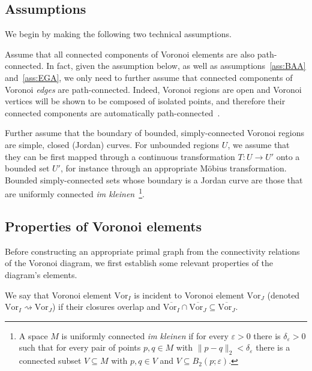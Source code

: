 \documentclass[11pt]{article}
\newcommand{\Vor}{\text{Vor}}
\begin{document}
\subsection{Assumptions}\label{sec:assumptions}

We begin by making the following two technical assumptions. 


\vspace*{0.1in}
Assume that all connected components of Voronoi elements are also path-connected. 
In fact, given the assumption below, as well as assumptions~\ref{ass:BAA} and~\ref{ass:EGA}, 
	we only need to further assume that connected components of Voronoi \emph{edges} are path-connected. 
Indeed, Voronoi regions are open and Voronoi vertices will be shown to be composed of isolated points, 
	and therefore their connected components are automatically path-connected~\cite[p.\ 158]{munkres2000topology}.


\vspace*{0.1in}
Further assume that the boundary of bounded, simply-connected Voronoi regions are simple, closed (Jordan) curves. 
For unbounded regions $U$, we assume that they can be first mapped 
	through a continuous transformation $T:U\rightarrow U'$
	onto a bounded set $U'$, for instance through an appropriate M{\"o}bius transformation. Bounded simply-connected sets whose boundary is a Jordan curve 
	are those that are uniformly connected \emph{im kleinen}~\cite{Moore1918}\footnote{
	A space $M$ is uniformly connected \emph{im kleinen} if for every $\varepsilon>0$ there is $\delta_\varepsilon>0$ 
	such that for every pair of points $p,q\in M$ with $\|p-q\|_2<\delta_\varepsilon$
		there is a connected subset $V\subseteq M$ with $p,q\in V$ and $V\subseteq B_2(p;\varepsilon)$. 
	}.





\subsection{Properties of Voronoi elements}\label{sec:properties}


Before constructing an appropriate primal graph from the connectivity relations of the Voronoi diagram, 
	we first establish some relevant properties of the diagram's elements. 

We say that Voronoi element $\Vor_I$ is incident to Voronoi element $\Vor_J$ 
	(denoted $\Vor_I\rightsquigarrow\Vor_J$)
	if their closures overlap  
	and $\overline{\Vor_I}\cap\overline{\Vor_J}\subseteq\overline{\Vor_J}$. 
\end{document}
